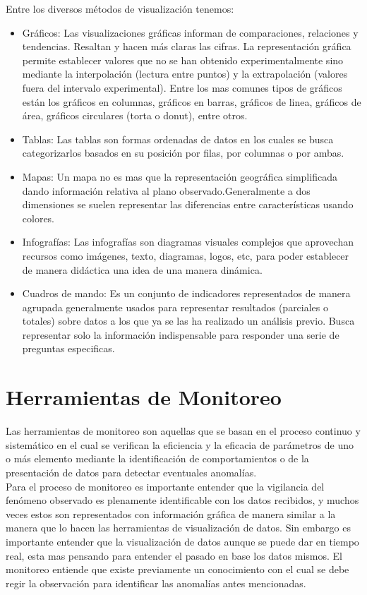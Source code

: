 Entre los diversos métodos de visualización tenemos:
\begin{itemize}
\item Gráficos: Las visualizaciones gráficas informan de comparaciones, relaciones y tendencias. Resaltan y hacen más claras las cifras.\cite{ibmviz} La representación gráfica permite establecer valores que no se han obtenido experimentalmente sino mediante la interpolación (lectura entre puntos) y la extrapolación (valores fuera del intervalo experimental). Entre los mas comunes tipos de gráficos están los gráficos en columnas, gráficos en barras, gráficos de linea, gráficos de área, gráficos circulares (torta o donut), entre otros.  
\item Tablas: Las tablas son formas ordenadas de datos en los cuales se busca categorizarlos basados en su posición por filas, por columnas o por ambas.
\item Mapas: Un mapa no es mas que la representación geográfica simplificada dando información relativa al plano observado.Generalmente a dos dimensiones se suelen representar las diferencias entre características usando colores.
\item Infografías: Las infografías son diagramas visuales complejos que aprovechan recursos como imágenes, texto, diagramas, logos, etc, para poder establecer de manera didáctica una idea de una manera dinámica.\
\item Cuadros de mando: Es un conjunto de indicadores representados de manera agrupada generalmente usados para representar resultados (parciales o totales) sobre datos a los que ya se las ha realizado un análisis previo. Busca representar solo la información indispensable para responder una serie de preguntas especificas.   
\end{itemize}


\section{Herramientas de Monitoreo}
Las herramientas de monitoreo son aquellas que se basan en el proceso continuo y sistemático en el cual se verifican la eficiencia y la eficacia de parámetros de uno o más elemento mediante la identificación de comportamientos o de la presentación de datos para detectar eventuales anomalías.\\

Para el proceso de monitoreo es importante entender que la vigilancia del fenómeno observado es plenamente identificable con los datos recibidos, y muchos veces estos son representados con información gráfica de manera similar a la manera que lo hacen las herramientas de visualización de datos. Sin embargo es importante entender que la visualización de datos aunque se puede dar en tiempo real, esta mas pensando para entender el pasado en base los datos mismos. El monitoreo entiende que existe previamente un conocimiento con el cual se debe regir la observación para identificar las anomalías antes mencionadas.\\

